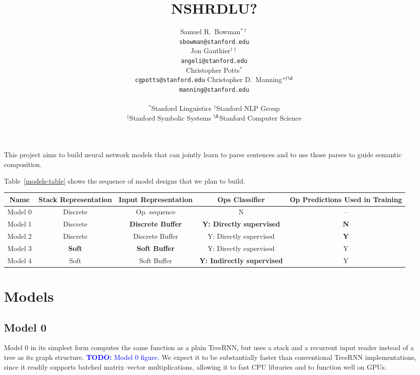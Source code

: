 \documentclass[11pt,letterpaper]{article}
\title{NSHRDLU?}
\author{
Samuel R.\ Bowman$^{\ast\dag}$ \\
\texttt{sbowman@stanford.edu} \\
\And
Jon Gauthier$^{\dag\ddag}$ \\
\texttt{angeli@stanford.edu} \\
\AND
Christopher Potts$^{\ast}$\\
\texttt{cgpotts@stanford.edu}
\And
Christopher D.\ Manning$^{\ast\dag\S}$\\
\texttt{manning@stanford.edu}\\
\AND\\[-3ex]
{$^{\ast}$Stanford Linguistics\quad
$^{\dag}$Stanford NLP Group}\\
{$^{\ddag}$Stanford Symbolic Systems\quad
$^{\S}$Stanford Computer Science}
}
\date{}
\newcommand\todo[1]{\textcolor{blue}{\textbf{TODO:} #1}}
\begin{document}
\maketitle

This project aims to build neural network models that can jointly learn to parse sentences and to use those parses to guide semantic composition.

Table~\ref{models-table} shows the sequence of model designs that we plan to build. 


\begin{table*}[t]
  \centering\small
  \begin{tabular}{ccccc} 
    \toprule
    Name & Stack Representation & Input Representation & Ops Classifier & Op Predictions Used in Training \\ 
    \midrule
Model 0 & Discrete & Op. sequence & N & -- \\
Model 1 & Discrete & \bf Discrete Buffer & \bf Y: Directly supervised & \bf N \\
Model 2 & Discrete & Discrete Buffer & Y: Directly supervised & \bf Y \\
Model 3 & \bf Soft & \bf Soft Buffer & Y: Directly supervised & Y \\
Model 4 & Soft & Soft Buffer & \bf Y: Indirectly supervised & Y \\
    \bottomrule
  \end{tabular}
  \protect\caption{\protect\label{models-table}Model variants, ordered by increasing reliance on learning. Bolding indicates the differences between each model and its parent model.} 
\end{table*}

\section{Models}

\subsection{Model 0}

Model 0 in its simplest form computes the same function as a plain TreeRNN, but uses a stack and a recurrent input reader instead of a tree as its graph structure. \todo{Model 0 figure.} We expect it to be substantially faster than conventional TreeRNN implementations, since it readily supports batched matrix--vector multiplications, allowing it to fast CPU libraries and to function well on GPUs.
\end{document}
